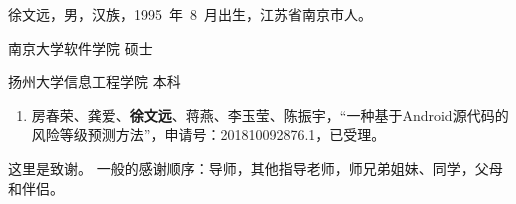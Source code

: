 \documentclass[master]{NJUthesis}
\theoremstyle{plain}
\begin{document}
\renewcommand*{\listtablename}{表~~目~~录}
\listoftables
{}
\renewcommand*{\listtablename}{图~~目~~录}
\listoffigures
{}

%

\mainmatter














\vspace{1ex}
\noindent 徐文远，男，汉族，1995~年~8~月出生，江苏省南京市人。
\vspace{2ex}

\begin{description}[labelindent=0em, leftmargin=8em, style=sameline]
\item[2018.9～2020.6] 南京大学软件学院 \hfill 硕士
\item[2014.9～2018.6] 扬州大学信息工程学院 \hfill 本科
\end{description}


\begin{enumerate}[label=\arabic*., labelindent=0em, leftmargin=*]
	\item 房春荣、龚爱、\textbf{徐文远}、蒋燕、李玉莹、陈振宇，``一种基于Android源代码的风险等级预测方法''，申请号：201810092876.1，已受理。
\end{enumerate}


\backmatter


\begin{thanks}

\vskip 18pt

这里是致谢。
一般的感谢顺序：导师，其他指导老师，师兄弟姐妹、同学，父母和伴侣。

\end{thanks}
\end{document}

